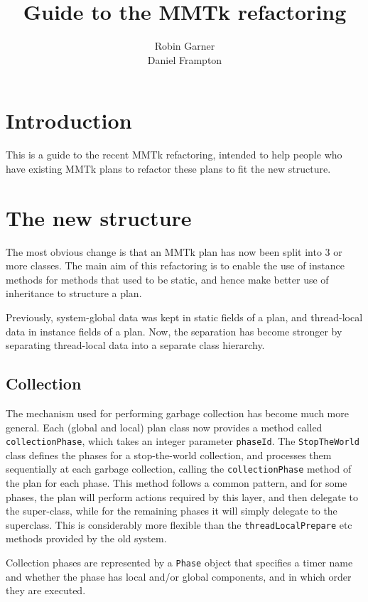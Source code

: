 \documentclass[10pt]{article}
\title{Guide to the MMTk refactoring}
\author{Robin Garner\\Daniel Frampton}
\newcommand{\code}[1]{\lstinline!#1!}
\begin{document}
\lstset{language=Java, basicstyle=\ttfamily\small}

\maketitle

\section{Introduction}

This is a guide to the recent MMTk refactoring, intended to help people
who have existing MMTk plans to refactor these plans to fit the new
structure. 

\section{The new structure}

The most obvious change is that an MMTk plan has now been split into 3
or more classes.  The main aim of this refactoring is to enable the
use of instance methods for methods that used to be static, and hence
make better use of inheritance to structure a plan.

Previously, system-global data was kept in static fields of a plan,
and thread-local data in instance fields of a plan.  Now, the
separation has become stronger by separating thread-local data into a
separate class hierarchy.  

\subsection{Collection}

The mechanism used for performing garbage collection has become much
more general.  Each (global and local) plan class now provides a
method called \code{collectionPhase}, which takes an integer parameter
\code{phaseId}.  The \code{StopTheWorld} class defines the phases for
a stop-the-world collection, and processes them sequentially at each
garbage collection, calling the \code{collectionPhase} method of the
plan for each phase.  This method follows a common pattern, and for
some phases, the plan will perform actions required by this layer, and
then delegate to the super-class, while for the remaining phases it
will simply delegate to the superclass. This is considerably more
flexible than the \code{threadLocalPrepare} etc methods provided by
the old system.

Collection phases are represented by a \code{Phase} object that
specifies a timer name and whether the phase has local and/or global
components, and in which order they are executed.  
\end{document}
